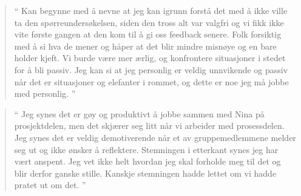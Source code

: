 \begin{quote}``
Kan begynne med å nevne at jeg kan igrunn forstå det med å ikke ville ta den spørreundersøkelsen, siden den 
tross alt var valgfri og vi fikk ikke vite første gangen at den kom til å gi oss feedback senere. Folk forsiktig med å si 
hva de mener og håper at det blir mindre misnøye og en bare holder kjeft. Vi burde være mer ærlig, og konfrontere 
situasjoner i stedet for å bli passiv. Jeg kan si at jeg personlig er veldig unnvikende og passiv når det er situasjoner 
og elefanter i rommet, og dette er noe jeg må jobbe med personlig.
''\end{quote} 

\begin{quote}``
Jeg synes det er gøy og produktivt å jobbe sammen med Nina på prosjektdelen, men det skjærer seg litt når vi 
arbeider med prosessdelen. Jeg synes det er veldig demotiverende når et av gruppemedlemmene melder seg ut 
og ikke ønsker å reflektere. Stemningen i etterkant synes jeg har vært anspent. Jeg vet ikke helt hvordan jeg skal 
forholde meg til det og blir derfor ganske stille. Kanskje stemningen hadde lettet om vi hadde pratet ut om det.
''\end{quote} 

